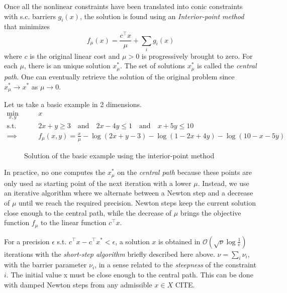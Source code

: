 \documentclass[11 pt]{report}
\begin{document}
Once all the nonlinear constraints have been translated into conic constraints with s.c. barriers $g_i(x)$, the solution is found using an \textit{Interior-point method} that minimizes
\begin{equation}
    f_{\mu} (x) = \frac{c^\top x}{\mu} + \sum_{i} g_i(x)
\end{equation}
where $c$ is the original linear cost and $\mu > 0$ is progressively brought to zero. For each $\mu$, there is an unique solution $x^*_{\mu}$. The set of solutions $x^*_{\mu}$ is called the \textit{central path}. One can eventually retrieve the solution of the original problem since $x^*_{\mu} \to x^*$ as $\mu \to 0$.

Let us take a basic example in 2 dimensions.
\begin{equation*}
\begin{aligned}
    \min_{x,y} \qquad &x\\
    \text{s.t.} \qquad & 2x + y \geq 3 \quad\text{and}\quad 2x - 4y \leq 1 \quad\text{and}\quad x + 5y \leq 10\\
    \implies \qquad & f_{\mu}(x,y) = \frac{x}{\mu} - \log(2x+y-3) - \log(1-2x+4y) - \log(10 - x - 5y)
\end{aligned}
\end{equation*}

\begin{figure}[ht]
    \centering
    
    \caption{Solution of the basic example using the interior-point method}
    \label{fig:interior_pt}
\end{figure}

In practice, no one computes the $x^*_{\mu}$ on the \textit{central path} because these points are only used as starting point of the next iteration with a lower $\mu$. Instead, we use an iterative algorithm where we alternate between a Newton step and a decrease of $\mu$ until we reach the required precision. Newton steps keep the current solution close enough to the central path, while the decrease of $\mu$ brings the objective function $f_{\mu}$ to the linear function $c^\top x$. 

For a precision $\epsilon$ s.t. $c^\top x - c^\top x^* < \epsilon$, a solution $x$ is obtained in $\mathcal{O}(\sqrt{\nu} \log \frac{1}{\epsilon})$ iterations with the \textit{short-step algorithm} briefly described here above. $\nu = \sum_{i} \nu_i$, with the barrier parameter $\nu_i$, in a sense related to the \textit{steepness} of the constraint $i$. The initial value x must be close enough to the central path. This can be done with damped Newton steps from any admissible $x \in X$ CITE.
\end{document}

